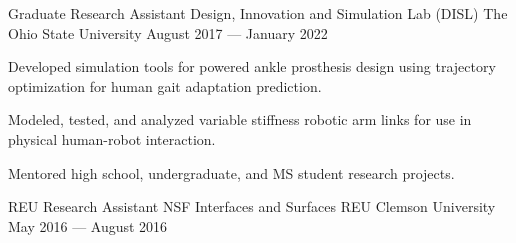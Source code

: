 \begin{cventries}
  \cventry
    {Graduate Research Assistant} %
    {Design, Innovation and Simulation Lab (DISL)} %
    {The Ohio State University} %
    {August 2017 --- January 2022} %
    {
      \begin{cvitems} %
        \item{Developed simulation tools for powered ankle prosthesis design using trajectory optimization for human gait adaptation prediction.}
        \item{Modeled, tested, and analyzed variable stiffness robotic arm links for use in physical human-robot interaction.}
        \item{Mentored high school, undergraduate, and MS student research projects.}
      \end{cvitems}
    }

\vspace{2mm}

  \cventry
    {REU Research Assistant} %
    {NSF Interfaces and Surfaces REU} %
    {Clemson University} %
    {May 2016 --- August 2016} %
    {
      \begin{cvitems} %
      \end{cvitems}
    }


\end{cventries}
